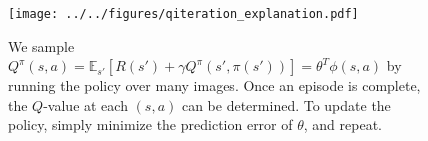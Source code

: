 \begin{figure}[ht]
\centering
\texttt{[image: ../../figures/qiteration\_explanation.pdf]}
\caption{
We sample $Q^\pi(s, a) = \mathbb{E}_{s'} \left[ R(s') + \gamma Q^\pi(s', \pi(s')) \right] = \theta^T \phi(s, a)$ by running the policy over many images.
Once an episode is complete, the $Q$-value at each $(s, a)$ can be determined.
To update the policy, simply minimize the prediction error of $\theta$, and repeat.
\label{fig:qiteration_explanation}}
\end{figure}
